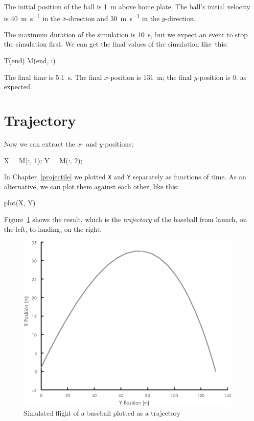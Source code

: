 The initial position of the ball is \SI{1}{\meter} above home plate.  The ball's initial velocity is \SI{40}{\meter\per\second} in the $x$-direction and \SI{30}{\meter\per\second} in the $y$-direction.


The maximum duration of the simulation is \SI{10}{\second}, but we expect an event to stop the simulation first.  We can get the final values of the simulation like~this:
    
\begin{code}
    T(end)
    M(end, :)
\end{code}

The final time is \SI{5.1}{\second}.  The final $x$-position is \SI{131}{\meter}; the final $y$-position is 0, as expected.


\section{Trajectory}

Now we can extract the $x$- and $y$-positions:

\begin{code}
    X = M(:, 1);
    Y = M(:, 2);
\end{code}

In Chapter~\ref{projectile} we plotted \lstinline{X} and \lstinline{Y} separately as functions of time.  As an alternative, we can plot them against each other, like this:

\begin{code}
    plot(X, Y)
\end{code}


Figure~\ref{fig:baseball3} shows the result, which is the \emph{trajectory} of the baseball from launch, on the left, to landing, on the right.

\begin{figure}[h]
\includegraphics{images/figure13_01_new.eps}
\caption{Simulated flight of a baseball plotted as a trajectory}
\label{fig:baseball3}
\end{figure}

